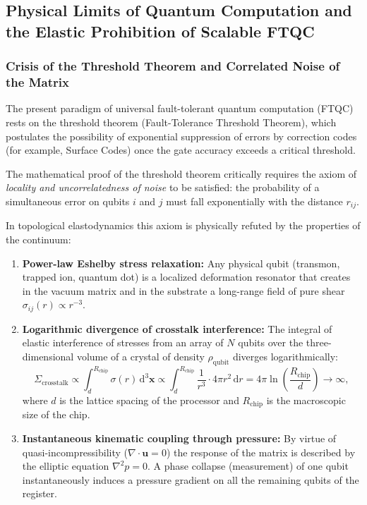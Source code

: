 \documentclass[11pt,a4paper]{article}
\theoremstyle{definition}
\theoremstyle{remark}
\begin{document}
\subsection{Physical Limits of Quantum Computation and the Elastic Prohibition of Scalable FTQC}

\subsubsection{Crisis of the Threshold Theorem and Correlated Noise of the Matrix}

The present paradigm of universal fault-tolerant quantum computation (FTQC) rests on the threshold theorem (Fault-Tolerance Threshold Theorem), which postulates the possibility of exponential suppression of errors by correction codes (for example, Surface Codes) once the gate accuracy exceeds a critical threshold.

The mathematical proof of the threshold theorem critically requires the axiom of \textit{locality and uncorrelatedness of noise} to be satisfied: the probability of a simultaneous error on qubits $i$ and $j$ must fall exponentially with the distance $r_{ij}$.

In topological elastodynamics this axiom is physically refuted by the properties of the continuum:
\begin{enumerate}
\item \textbf{Power-law Eshelby stress relaxation:} Any physical qubit (transmon, trapped ion, quantum dot) is a localized deformation resonator that creates in the vacuum matrix and in the substrate a long-range field of pure shear $\sigma_{ij}(r) \propto r^{-3}$.
\item \textbf{Logarithmic divergence of crosstalk interference:} The integral of elastic interference of stresses from an array of $N$ qubits over the three-dimensional volume of a crystal of density $\rho_{\mathrm{qubit}}$ diverges logarithmically:
\begin{equation}
\Sigma_{\mathrm{crosstalk}} \propto \int_{d}^{R_{\mathrm{chip}}} \sigma(r) \, \mathrm{d}^3\mathbf{x} \propto \int_{d}^{R_{\mathrm{chip}}} \frac{1}{r^3} \cdot 4\pi r^2 \, \mathrm{d}r = 4\pi \ln\left(\frac{R_{\mathrm{chip}}}{d}\right) \to \infty,
\label{eq:eshelby_crosstalk_divergence}
\end{equation}
where $d$ is the lattice spacing of the processor and $R_{\mathrm{chip}}$ is the macroscopic size of the chip.
\item \textbf{Instantaneous kinematic coupling through pressure:} By virtue of quasi-incompressibility ($\nabla \cdot \mathbf{u} = 0$) the response of the matrix is described by the elliptic equation $\nabla^2 p = 0$. A phase collapse (measurement) of one qubit instantaneously induces a pressure gradient on all the remaining qubits of the register.
\end{enumerate}
\end{document}
